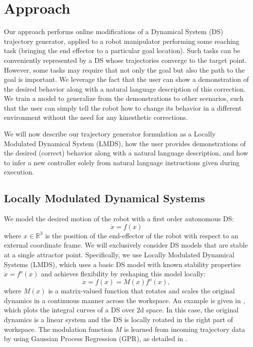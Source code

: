 
\section{Approach}
\label{sec:approach}

Our approach performs online modifications of a Dynamical System (DS) trajectory generator, applied to a robot manipulator performing some reaching task (bringing the end effector to a particular goal location).
Such tasks can be conveniently represented by a DS whose trajectories converge to the target point.
However, some tasks may require that not only the goal but also the path to the goal is important.
We leverage the fact that the user can show a demonstration of the desired behavior along with a natural language description of this correction.
We train a model to generalize from the demonstrations to other scenarios, such that the user can simply tell the robot how to change its behavior in a different environment without the need for any kinesthetic corrections.

We will now describe our trajectory generator formulation as a Locally Modulated Dynamical System (LMDS), how the user provides demonstrations of the desired (correct) behavior along with a natural language description, and how to infer a new controller solely from natural language instructions given during execution.

\subsection{Locally Modulated Dynamical Systems}

We model the desired motion of the robot with a first order autonomous DS:
\begin{equation}
  \label{eq:DS_general}
  \dot x = f(x)
\end{equation}
where $x \in \mathbb{R}^3$ is the position of the end-effector of the robot with respect to an external coordinate frame.
We will exclusively consider DS models that are stable at a single attractor point.
Specifically, we use Locally Modulated Dynamical Systems (LMDS), which uses a basic DS model with known stability properties $\dot x = f^o(x)$ and achieves flexibility by reshaping this model locally:
\begin{equation}
  \label{eq:DS_reshaped}
  \dot x = f(x) = M(x)f^o(x),
\end{equation}
where $M(x)$ is a matrix-valued function that rotates and scales the original dynamics in a continuous manner across the workspace.
An example is given in , which plots the integral curves of a DS over 2d space.
In this case, the original dynamics is a linear system and the DS is locally rotated in the right part of workspace.
The modulation function $M$ is learned from incoming trajectory data by using Gaussian Process Regression (GPR), as detailed in \cite{Kronander2015}.


